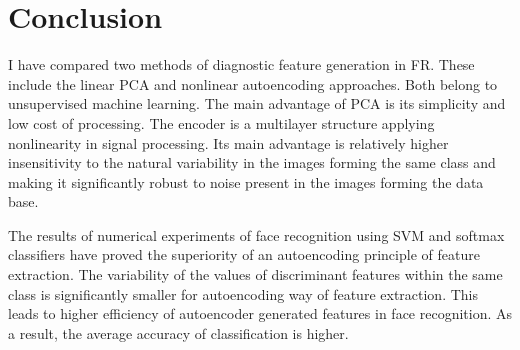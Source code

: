 \section{Conclusion}

I have compared two methods of diagnostic feature generation in FR. These
include the linear PCA and nonlinear autoencoding approaches. Both belong to
unsupervised machine learning. The main advantage of PCA is its simplicity and
low cost of processing. The encoder is a multilayer structure applying
nonlinearity in signal processing. Its main advantage is relatively higher
insensitivity to the natural variability in the images forming the same class
and making it significantly robust to noise present in the images forming the
data base. 

The results of numerical experiments of face recognition using SVM and softmax
classifiers have proved the superiority of an autoencoding principle of feature
extraction. The variability of the values of discriminant features within the
same class is significantly smaller for autoencoding way of feature extraction.
This leads to higher efficiency of autoencoder generated features in face
recognition. As a result, the average accuracy of classification is higher.
